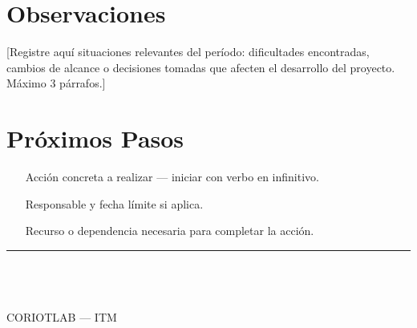 \documentclass[11pt, letterpaper]{article}
\newcommand{\FirmaSimple}{%
  \vspace{2em}
  \noindent
  \begin{minipage}{8.5cm}
    {\color{AzulITM}\rule{7.5cm}{0.8pt}}\\[6pt]
    {\normalsize\bfseries\color{GrisPizarra}\DocAutor}\\[3pt]
    {\small\color{GrisMedio}\DocCargo}\\[2pt]
    {\small\color{GrisMedio}CORIOTLAB — ITM}\\[2pt]
    {\small\color{GrisMedio}\DocFecha}
  \end{minipage}
}
\begin{document}

\section{Observaciones}

[Registre aquí situaciones relevantes del período: dificultades
encontradas, cambios de alcance o decisiones tomadas que afecten el
desarrollo del proyecto. Máximo 3 párrafos.]

\begin{tcolorbox}
\end{tcolorbox}


\section{Próximos Pasos}

\begin{itemize}[label={\color{AzulITM}\textbf{>}},
                leftmargin=1.8em, itemsep=2pt, topsep=0pt]
  \item [Acción concreta a realizar — iniciar con verbo en infinitivo.]
  \item [Responsable y fecha límite si aplica.]
  \item [Recurso o dependencia necesaria para completar la acción.]
\end{itemize}

\vspace*{\fill}
\FirmaSimple



\end{document}
